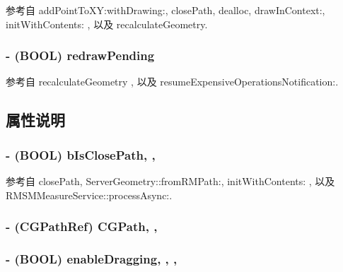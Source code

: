 参考自 add\-Point\-To\-X\-Y\-:with\-Drawing\-:, close\-Path, dealloc, draw\-In\-Context\-:, init\-With\-Contents\-: , 以及 recalculate\-Geometry.

\hypertarget{interface_r_m_path_a01f6bb4208525cf246b68cdf8f6bf510}{
\subsubsection[{redraw\-Pending}]{\setlength{\rightskip}{0pt plus 5cm}-\/ (B\-O\-O\-L) redraw\-Pending\hspace{0.3cm}{\ttfamily [protected]}}}\label{interface_r_m_path_a01f6bb4208525cf246b68cdf8f6bf510}


参考自 recalculate\-Geometry , 以及 resume\-Expensive\-Operations\-Notification\-:.



\subsection{属性说明}
\hypertarget{interface_r_m_path_a5e0cdd3cfdf9f079c87555b21e3a8c6e}{
\subsubsection[{b\-Is\-Close\-Path}]{\setlength{\rightskip}{0pt plus 5cm}-\/ (B\-O\-O\-L) b\-Is\-Close\-Path\hspace{0.3cm}{\ttfamily [read]}, {\ttfamily [atomic]}, {\ttfamily [assign]}}}\label{interface_r_m_path_a5e0cdd3cfdf9f079c87555b21e3a8c6e}


参考自 close\-Path, Server\-Geometry\-::from\-R\-M\-Path\-:, init\-With\-Contents\-: , 以及 R\-M\-S\-M\-Measure\-Service\-::process\-Async\-:.

\hypertarget{interface_r_m_path_af8606a78ec0d3c5994f95b6e5b5b1fd4}{
\subsubsection[{C\-G\-Path}]{\setlength{\rightskip}{0pt plus 5cm}-\/ (C\-G\-Path\-Ref) C\-G\-Path\hspace{0.3cm}{\ttfamily [read]}, {\ttfamily [nonatomic]}, {\ttfamily [assign]}}}\label{interface_r_m_path_af8606a78ec0d3c5994f95b6e5b5b1fd4}
\hypertarget{interface_r_m_path_a6a67c253aa7d8b01eb220c8bcfd9e82f}{
\subsubsection[{enable\-Dragging}]{\setlength{\rightskip}{0pt plus 5cm}-\/ (B\-O\-O\-L) enable\-Dragging\hspace{0.3cm}{\ttfamily [read]}, {\ttfamily [write]}, {\ttfamily [atomic]}, {\ttfamily [assign]}}}\label{interface_r_m_path_a6a67c253aa7d8b01eb220c8bcfd9e82f}


